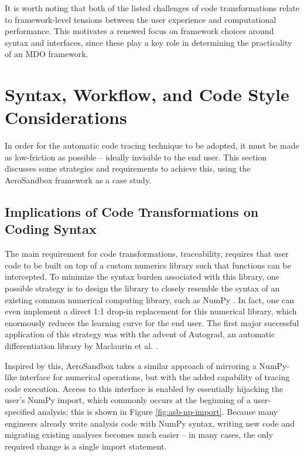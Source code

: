 It is worth noting that both of the listed challenges of code transformations relate to framework-level tensions between the user experience and computational performance. This motivates a renewed focus on framework choices around syntax and interfaces, since these play a key role in determining the practicality of an MDO framework.

\section{Syntax, Workflow, and Code Style Considerations}
\label{sec:syntax-interface}

In order for the automatic code tracing technique to be adopted, it must be made as low-friction as possible -- ideally invisible to the end user. This section discusses some strategies and requirements to achieve this, using the AeroSandbox framework as a case study.

\subsection{Implications of Code Transformations on Coding Syntax}
\label{sec:code_syntax}

The main requirement for code transformations, traceability, requires that user code to be built on top of a custom numerics library such that functions can be intercepted. To minimize the syntax burden associated with this library, one possible strategy is to design the library to closely resemble the syntax of an existing common numerical computing library, such as NumPy \cite{harris_array_2020}. In fact, one can even implement a direct 1:1 drop-in replacement for this numerical library, which enormously reduces the learning curve for the end user. The first major successful application of this strategy was with the advent of Autograd, an automatic differentiation library by Maclaurin et al. \cite{maclaurin_autograd_2015}.

Inspired by this, AeroSandbox takes a similar approach of mirroring a NumPy-like interface for numerical operations, but with the added capability of tracing code execution. Access to this interface is enabled by essentially hijacking the user's NumPy import, which commonly occurs at the beginning of a user-specified analysis; this is shown in Figure \ref{fig:asb-np-import}. Because many engineers already write analysis code with NumPy syntax, writing new code and migrating existing analyses becomes much easier -- in many cases, the only required change is a single import statement.

